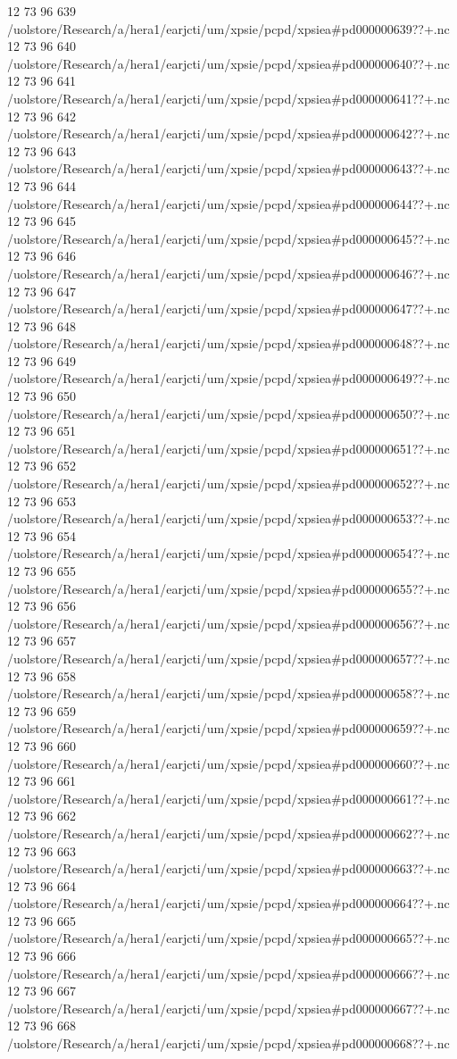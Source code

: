 12 73 96
639
/uolstore/Research/a/hera1/earjcti/um/xpsie/pcpd/xpsiea#pd000000639??+.nc
12 73 96
640
/uolstore/Research/a/hera1/earjcti/um/xpsie/pcpd/xpsiea#pd000000640??+.nc
12 73 96
641
/uolstore/Research/a/hera1/earjcti/um/xpsie/pcpd/xpsiea#pd000000641??+.nc
12 73 96
642
/uolstore/Research/a/hera1/earjcti/um/xpsie/pcpd/xpsiea#pd000000642??+.nc
12 73 96
643
/uolstore/Research/a/hera1/earjcti/um/xpsie/pcpd/xpsiea#pd000000643??+.nc
12 73 96
644
/uolstore/Research/a/hera1/earjcti/um/xpsie/pcpd/xpsiea#pd000000644??+.nc
12 73 96
645
/uolstore/Research/a/hera1/earjcti/um/xpsie/pcpd/xpsiea#pd000000645??+.nc
12 73 96
646
/uolstore/Research/a/hera1/earjcti/um/xpsie/pcpd/xpsiea#pd000000646??+.nc
12 73 96
647
/uolstore/Research/a/hera1/earjcti/um/xpsie/pcpd/xpsiea#pd000000647??+.nc
12 73 96
648
/uolstore/Research/a/hera1/earjcti/um/xpsie/pcpd/xpsiea#pd000000648??+.nc
12 73 96
649
/uolstore/Research/a/hera1/earjcti/um/xpsie/pcpd/xpsiea#pd000000649??+.nc
12 73 96
650
/uolstore/Research/a/hera1/earjcti/um/xpsie/pcpd/xpsiea#pd000000650??+.nc
12 73 96
651
/uolstore/Research/a/hera1/earjcti/um/xpsie/pcpd/xpsiea#pd000000651??+.nc
12 73 96
652
/uolstore/Research/a/hera1/earjcti/um/xpsie/pcpd/xpsiea#pd000000652??+.nc
12 73 96
653
/uolstore/Research/a/hera1/earjcti/um/xpsie/pcpd/xpsiea#pd000000653??+.nc
12 73 96
654
/uolstore/Research/a/hera1/earjcti/um/xpsie/pcpd/xpsiea#pd000000654??+.nc
12 73 96
655
/uolstore/Research/a/hera1/earjcti/um/xpsie/pcpd/xpsiea#pd000000655??+.nc
12 73 96
656
/uolstore/Research/a/hera1/earjcti/um/xpsie/pcpd/xpsiea#pd000000656??+.nc
12 73 96
657
/uolstore/Research/a/hera1/earjcti/um/xpsie/pcpd/xpsiea#pd000000657??+.nc
12 73 96
658
/uolstore/Research/a/hera1/earjcti/um/xpsie/pcpd/xpsiea#pd000000658??+.nc
12 73 96
659
/uolstore/Research/a/hera1/earjcti/um/xpsie/pcpd/xpsiea#pd000000659??+.nc
12 73 96
660
/uolstore/Research/a/hera1/earjcti/um/xpsie/pcpd/xpsiea#pd000000660??+.nc
12 73 96
661
/uolstore/Research/a/hera1/earjcti/um/xpsie/pcpd/xpsiea#pd000000661??+.nc
12 73 96
662
/uolstore/Research/a/hera1/earjcti/um/xpsie/pcpd/xpsiea#pd000000662??+.nc
12 73 96
663
/uolstore/Research/a/hera1/earjcti/um/xpsie/pcpd/xpsiea#pd000000663??+.nc
12 73 96
664
/uolstore/Research/a/hera1/earjcti/um/xpsie/pcpd/xpsiea#pd000000664??+.nc
12 73 96
665
/uolstore/Research/a/hera1/earjcti/um/xpsie/pcpd/xpsiea#pd000000665??+.nc
12 73 96
666
/uolstore/Research/a/hera1/earjcti/um/xpsie/pcpd/xpsiea#pd000000666??+.nc
12 73 96
667
/uolstore/Research/a/hera1/earjcti/um/xpsie/pcpd/xpsiea#pd000000667??+.nc
12 73 96
668
/uolstore/Research/a/hera1/earjcti/um/xpsie/pcpd/xpsiea#pd000000668??+.nc
